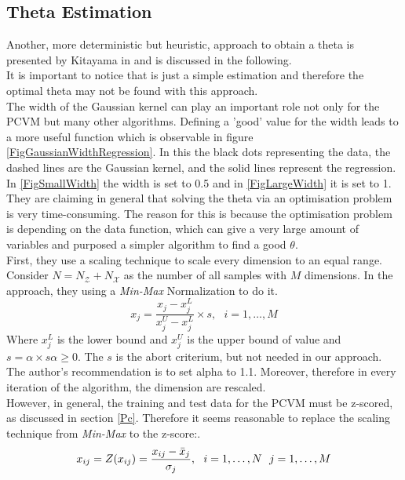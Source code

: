 \subsection{Theta Estimation}\label{InSubSecTheta}
Another, more deterministic but heuristic, approach to obtain a theta is presented by Kitayama in \cite{Kitayama.2011} and is discussed in the following.\\
It is important to notice that is just a simple estimation and therefore the optimal theta may not be found with this approach.\\
The width of the Gaussian kernel can play an important role not only for the \acs{PCVM} but many other algorithms.
Defining a 'good' value for the width leads to a more useful function which is observable in figure \ref{FigGaussianWidthRegression}.\cite{Kitayama.2011}
In this the black dots representing the data, the dashed lines are the Gaussian kernel, and the solid lines represent the regression.
In  \ref{FigSmallWidth} the width is set to 0.5 and in \ref{FigLargeWidth} it is set to 1.\newline
They are claiming in general that solving the theta via an optimisation problem is very time-consuming.
The reason for this is because the optimisation problem is depending on the data function, which can give a very large amount of variables and purposed a simpler algorithm to find a good $\theta$.\cite{Kitayama.2011}\\
First, they use a scaling technique to scale every dimension to an equal range.
Consider $N = N_\mathcal{Z} + N_\mathcal{X}$ as the number of all samples with $M$ dimensions.
In the approach, they using a \textit{Min-Max} Normalization to do it.\cite{Kitayama.2011}
\begin{equation}
	x_j = \frac{x_j - x_j^L}{x_j^U-x_j^L} \times s, \>\>\> i=1,\dots,M 
\end{equation}
Where $x_j^L$ is the lower bound and $x_j^U$ is the upper bound of value and $s=\alpha\times s \alpha \ge 0$.
The $s$ is the abort criterium, but not needed in our approach.
The author's recommendation is to set alpha to 1.1.
Moreover, therefore in every iteration of the algorithm, the dimension are rescaled.\\
However, in general, the training and test data for the \acs{PCVM} must be z-scored, as discussed in section \ref{Pc}.
Therefore it seems reasonable to replace the scaling technique from \textit{Min-Max} to the z-score:\cite{Mohamad.2013}.
\begin{equation}\label{EqZTrans}
x_{ij} = Z(x_{ij}) = \frac{x_{ij}-\bar{x}_j}{\sigma_j},\>\>\> i=1,\dots,N \>\>\> j=1,\dots,M
\end{equation}
